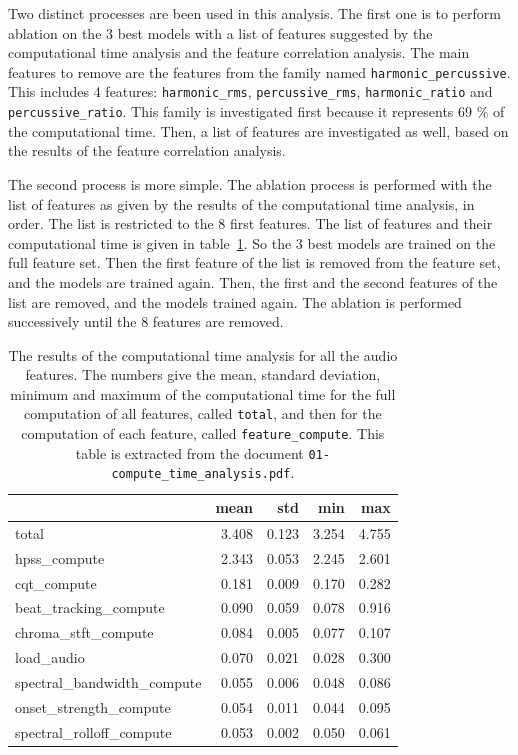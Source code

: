 \documentclass[11pt]{article}
\begin{document}
Two distinct processes are been used in this analysis. The first one is to perform ablation on the 3 best models with a list of features suggested by the computational time analysis and the feature correlation analysis. The main features to remove are the features from the family named \texttt{harmonic\_percussive}. This includes 4 features: \texttt{harmonic\_rms}, \texttt{percussive\_rms},  \texttt{harmonic\_ratio} and \texttt{percussive\_ratio}. This family is investigated first because it represents 69 \% of the computational time. Then, a list of features are investigated as well, based on the results of the feature correlation analysis.

The second process is more simple. The ablation process is performed with the list of features as given by the results of the computational time analysis, in order. The list is restricted to the 8 first features. The list of features and their computational time is given in table~\ref{tab:table1}. So the 3 best models are trained on the full feature set. Then the first feature of the list is removed from the feature set, and the models are trained again. Then, the first and the second features of the list are removed, and the models trained again. The ablation is performed successively until the 8 features are removed.


\begin{table}
  \centering
  \begin{tabular}{lrrrr}
    \toprule
    & mean & std & min & max \\
    \midrule
    total & 3.408 & 0.123 & 3.254 & 4.755 \\
 hpss\_compute & 2.343 & 0.053 & 2.245 & 2.601 \\
cqt\_compute & 0.181 & 0.009 & 0.170 & 0.282 \\
beat\_tracking\_compute & 0.090 & 0.059 & 0.078 & 0.916 \\
chroma\_stft\_compute & 0.084 & 0.005 & 0.077 & 0.107 \\
load\_audio & 0.070 & 0.021 & 0.028 & 0.300 \\
spectral\_bandwidth\_compute & 0.055 & 0.006 & 0.048 & 0.086 \\
onset\_strength\_compute & 0.054 & 0.011 & 0.044 & 0.095 \\
spectral\_rolloff\_compute & 0.053 & 0.002 & 0.050 & 0.061 \\
\bottomrule
  \end{tabular}
    \caption{The results of the computational time analysis for all the audio features. The numbers give the mean, standard deviation, minimum and maximum of the computational time for the full computation of all features, called \texttt{total}, and then for the computation of each feature, called \texttt{feature\_compute}. This table is extracted from the document \texttt{01-compute\_time\_analysis.pdf}.}
    \label{tab:table1}
\end{table}
\end{document}
